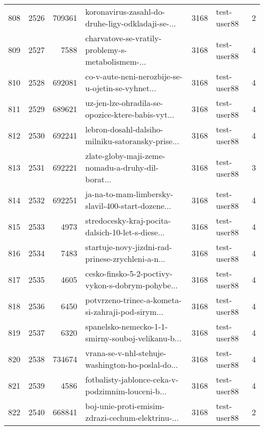 \begin{tabular}{lrrlrlr}
808  &       2526 &   709361 &  koronavirus-zasahl-do-druhe-ligy-odkladaji-se-... &     3168 &                  test-user88 &               2 \\
809  &       2527 &     7588 &  charvatove-se-vratily-problemy-s-metabolismem-... &     3168 &                  test-user88 &               4 \\
810  &       2528 &   692081 &  co-v-aute-neni-nerozbije-se-u-ojetin-se-vyhnet... &     3168 &                  test-user88 &               4 \\
811  &       2529 &   689621 &  uz-jen-lze-ohradila-se-opozice-ktere-babis-vyt... &     3168 &                  test-user88 &               4 \\
812  &       2530 &   692241 &  lebron-dosahl-dalsiho-milniku-satoransky-prise... &     3168 &                  test-user88 &               4 \\
813  &       2531 &   692221 &  zlate-globy-maji-zeme-nomadu-a-druhy-dil-borat... &     3168 &                  test-user88 &               3 \\
814  &       2532 &   692251 &  ja-na-to-mam-limbersky-slavil-400-start-dozene... &     3168 &                  test-user88 &               4 \\
815  &       2533 &     4973 &  stredocesky-kraj-pocita-dalsich-10-let-s-diese... &     3168 &                  test-user88 &               4 \\
816  &       2534 &     7483 &  startuje-novy-jizdni-rad-prinese-zrychleni-a-n... &     3168 &                  test-user88 &               4 \\
817  &       2535 &     4605 &  cesko-finsko-5-2-poctivy-vykon-s-dobrym-pohybe... &     3168 &                  test-user88 &               4 \\
818  &       2536 &     6450 &  potvrzeno-trinec-a-kometa-si-zahraji-pod-sirym... &     3168 &                  test-user88 &               4 \\
819  &       2537 &     6320 &  spanelsko-nemecko-1-1-smirny-souboj-velikanu-b... &     3168 &                  test-user88 &               4 \\
820  &       2538 &   734674 &  vrana-se-v-nhl-stehuje-washington-ho-poslal-do... &     3168 &                  test-user88 &               4 \\
821  &       2539 &     4586 &  fotbalisty-jablonce-ceka-v-podzimnim-louceni-b... &     3168 &                  test-user88 &               4 \\
822  &       2540 &   668841 &  boj-unie-proti-emisim-zdrazi-cechum-elektrinu-... &     3168 &                  test-user88 &               2 \\

\end{tabular}
